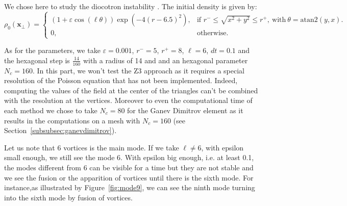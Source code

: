 \documentclass[proc]{edpsmath}
\begin{document}
We chose here to study the diocotron instability \cite{madaule:hal-00841504}.
The initial density is given by:
\begin{equation*}
 \rho_0(\mathbf{x}_\bot)=
 \left\{
 \begin{array}{ll}
  (1+\varepsilon\cos(\ell\theta))\exp{(-4(r-6.5)^2)},&\text{if  } r^-\leq\sqrt{x^2+y^2}\leq r^+,~ \text{with} ~\theta=\text{atan2}(y,x).\\[3mm]
  0,&\text{otherwise}.
 \end{array}
 \right.
\end{equation*}

\noindent As for the parameters, we take $\varepsilon=0.001$, $r^-=5$, $r^+=8$, $\ell=6$, $dt=0.1$ and the hexagonal step is $\frac{14}{160}$ with a radius of 14 and and an hexagonal parameter $N_c =160$.
In this part, we won't test the Z3 approach as it requires a special resolution of the Poisson equation that has not been implemented. Indeed, computing the values of the field at the center of the triangles can't be combined with the resolution at the vertices. 
Moreover to even the computational time of each method we chose to take $N_c=80$ for the Ganev Dimitrov element as it results in the computations on a mesh with $N_c =160$ (see Section~\ref{subsubsec:ganevdimitrov}).

Let us note that 6 vortices is the main mode. If we take $\ell\neq6$, with epsilon small enough, we still see the mode 6. With epsilon big enough, i.e. at least 0.1, the modes different from 6 can be visible for a time but they are not stable and we see the fusion or the apparition of vortices until there is the sixth mode. For instance,as illustrated by Figure~\ref{fig:mode9}, we can see the ninth mode turning into the sixth mode by fusion of vortices.
\end{document}
